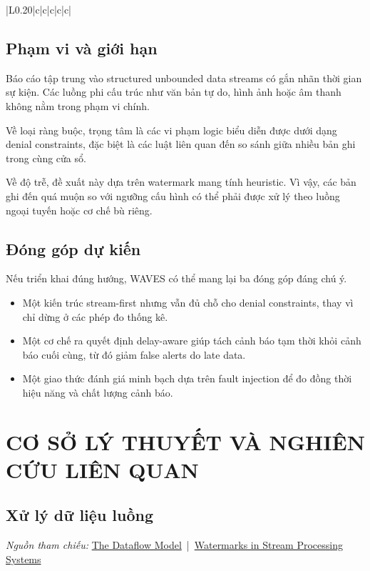 {\begin{longtable}{|L{0.20\textwidth}|c|c|c|c|c|}
\section{Phạm vi và giới hạn}

Báo cáo tập trung vào structured unbounded data streams có gắn nhãn thời gian sự kiện. Các luồng phi cấu trúc như văn bản tự do, hình ảnh hoặc âm thanh không nằm trong phạm vi chính.

Về loại ràng buộc, trọng tâm là các vi phạm logic biểu diễn được dưới dạng denial constraints, đặc biệt là các luật liên quan đến so sánh giữa nhiều bản ghi trong cùng cửa sổ.

Về độ trễ, đề xuất này dựa trên watermark mang tính heuristic. Vì vậy, các bản ghi đến quá muộn so với ngưỡng cấu hình có thể phải được xử lý theo luồng ngoại tuyến hoặc cơ chế bù riêng.

\section{Đóng góp dự kiến}

Nếu triển khai đúng hướng, WAVES có thể mang lại ba đóng góp đáng chú ý.

\begin{itemize}
  \item Một kiến trúc stream-first nhưng vẫn đủ chỗ cho denial constraints, thay vì chỉ dừng ở các phép đo thống kê.
  \item Một cơ chế ra quyết định delay-aware giúp tách cảnh báo tạm thời khỏi cảnh báo cuối cùng, từ đó giảm false alerts do late data.
  \item Một giao thức đánh giá minh bạch dựa trên fault injection để đo đồng thời hiệu năng và chất lượng cảnh báo.
\end{itemize}

\chapter{CƠ SỞ LÝ THUYẾT VÀ NGHIÊN CỨU LIÊN QUAN}

\section{Xử lý dữ liệu luồng}

\noindent \textit{Nguồn tham chiếu: }
\href{https://research.google.com/pubs/archive/43864.pdf}{The Dataflow Model} \,|\, \href{https://dl.acm.org/doi/10.14778/3476311.3476389}{Watermarks in Stream Processing Systems}


\end{longtable}}
